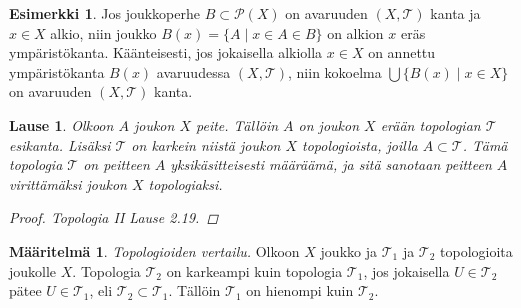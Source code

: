 \documentclass[12pt,a4paper,leqno]{report}
\newcommand{\T}{\mathcal{T}}
\newcommand{\Pot}{\mathcal{P}}
\theoremstyle{plain}
\newtheorem{lause}[equation]{Lause}
\theoremstyle{definition}
\newtheorem{maar}[equation]{Määritelmä}
\newtheorem{esim}[equation]{Esimerkki}
\theoremstyle{remark}
\begin{document}
\begin{esim}
Jos joukkoperhe $B\subset\Pot(X)$ on avaruuden $(X,\T)$ kanta ja 
$x\in X$ alkio, niin joukko 
$B(x)=\{A\mid x\in A\in B\}$ on alkion $x$ eräs ympäristökanta.
Käänteisesti, jos jokaisella alkiolla $x\in X$ on annettu ympäristökanta 
$B(x)$ avaruudessa $(X,\T)$, niin kokoelma $\bigcup\{B(x)\mid x\in X\}$ 
on avaruuden $(X,\T)$ kanta.
\end{esim}
\begin{lause}
Olkoon $A$ joukon $X$ peite. Tällöin $A$ on joukon $X$ erään topologian $\T$ esikanta. 
Lisäksi $\T$ on karkein niistä joukon $X$ topologioista, joilla $A\subset\T$. 
Tämä topologia $\T$ on peitteen $A$ yksikäsitteisesti määräämä, ja sitä sanotaan peitteen $A$ virittämäksi joukon $X$ topologiaksi.
\begin{proof}
Topologia II \cite{Topo2} Lause 2.19.
\end{proof}
\end{lause}
\begin{maar}
\emph{Topologioiden vertailu.}
Olkoon $X$ joukko ja $\T_1$ ja $\T_2$ topologioita joukolle $X$.
Topologia $\T_2$ on karkeampi kuin topologia $\T_1$, 
jos jokaisella $ U\in\T_2$ pätee $ U\in\T_1$, eli $ \T_2\subset\T_1$. 
Tällöin $\T_1$ on hienompi kuin $\T_2$.
\end{maar}
\end{document}
